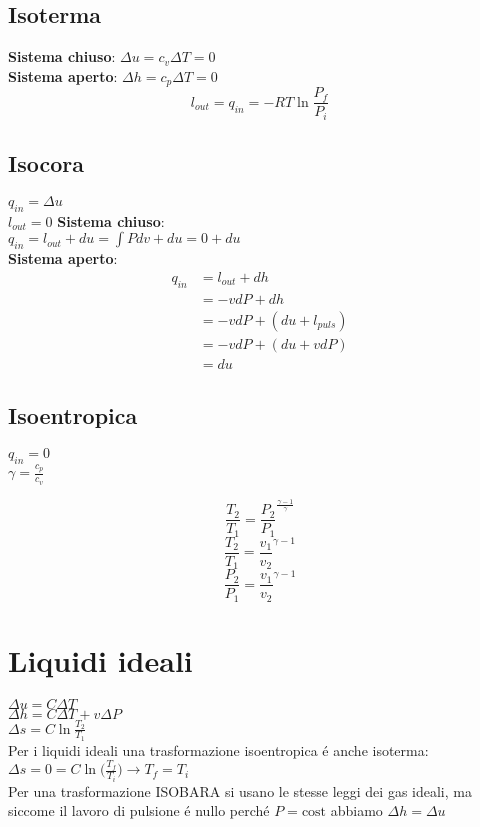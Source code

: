 \documentclass[portrait,a4paper]{article}
\begin{document}
\begin{multicols}{3}
\subsection*{Isoterma}
\textbf{Sistema chiuso}: \(\Delta u = c_v\Delta T = 0\) \\
\textbf{Sistema aperto}: \(\Delta h = c_p\Delta T = 0\)
\[ l_{out} = q_{in} = -RT\ln\frac{P_f}{P_i}\]

\subsection*{Isocora}
\(q_{in} = \Delta u\) \\
\(l_{out} = 0\)
\textbf{Sistema chiuso}: \\
\(q_{in} = l_{out} + du = \int Pdv + du = 0 + du\) \\
\textbf{Sistema aperto}:
\begin{align*}
	q_{in} &= l_{out} + dh \\
	&= -vdP + dh \\
	&= -vdP + (du + l_{puls}) \\
	&= -vdP + (du + vdP) \\
	&= du	
\end{align*}


\subsection*{Isoentropica}

\begin{center}
	\(q_{in} = 0\) \\	
	\( \gamma = \frac{c_p}{c_v} \)
\end{center}
\begin{multicols}{3}
\noindent
\[\frac{T_2}{T_1}=\frac{P_2}{P_1}^{\frac{\gamma -1}{\gamma}}\]
\[\frac{T_2}{T_1}=\frac{v_1}{v_2}^{\gamma -1}\]
\[\frac{P_2}{P_1}=\frac{v_1}{v_2}^{\gamma -1}\]
\end{multicols}

\section*{Liquidi ideali}
$ \Delta u = C\Delta T $ \\
$ \Delta h = C\Delta T + v\Delta P $ \\
$ \Delta s = C\ln\frac{T_2}{T_1} $ \\
Per i liquidi ideali una trasformazione isoentropica é anche isoterma: \\
\(\Delta s = 0 = C\ln\big(\frac{T_f}{T_i}\big) \rightarrow T_f = T_i \) \\
Per una trasformazione ISOBARA si usano le stesse leggi dei gas ideali, ma siccome il lavoro di pulsione é nullo perché \(P=\text{cost}\) abbiamo \(\Delta h = \Delta u\)

\end{multicols}
\end{document}
